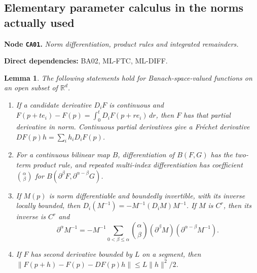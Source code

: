 \documentclass[11pt,a4paper]{article}
\newtheorem{lemma}[theorem]{Lemma}
\theoremstyle{remark}\newtheorem{remark}[theorem]{Remark}
\newcommand{\R}{\mathbb R}\newcommand{\C}{\mathbb C}\newcommand{\N}{\mathbb N}
\newcommand{\node}[3]{\par\Needspace{6\baselineskip}\smallskip\hypertarget{node:#1}{}\label{nodepage:#1}\noindent\textbf{Node \texttt{#1}.} \textit{#2.}\par\noindent\textbf{Direct dependencies:} #3.\par}
\begin{document}
\subsection{Elementary parameter calculus in the norms actually used}
\node{CA01}{Norm differentiation, product rules and integrated remainders}{BA02, ML-FTC, ML-DIFF}
\begin{lemma}\label{lem:normcalculus}
The following statements hold for Banach-space-valued functions on an open subset of $\R^d$.
\begin{enumerate}
\item If a candidate derivative $D_iF$ is continuous and
$F(p+te_i)-F(p)=\int_0^t D_iF(p+re_i)\,dr$, then $F$ has that partial derivative in norm. Continuous partial derivatives give a Fr\'echet derivative $DF(p)h=\sum_i h_iD_iF(p)$.
\item For a continuous bilinear map $B$, differentiation of $B(F,G)$ has the two-term product rule, and repeated multi-index differentiation has coefficient $\binom\alpha\beta$ for $B(\partial^\beta F,\partial^{\alpha-\beta}G)$.
\item If $M(p)$ is norm differentiable and boundedly invertible, with its inverse locally bounded, then
$D_i(M^{-1})=-M^{-1}(D_iM)M^{-1}$. If $M$ is $C^r$, then its inverse is $C^r$ and
\[
 \partial^\alpha M^{-1}
 =-M^{-1}\sum_{0<\beta\leq\alpha}\binom\alpha\beta
       (\partial^\beta M)(\partial^{\alpha-\beta}M^{-1}).
\]
\item If $F$ has second derivative bounded by $L$ on a segment, then
$\|F(p+h)-F(p)-DF(p)h\|\leq L\|h\|^2/2$.
\end{enumerate}
\end{lemma}
\end{document}
